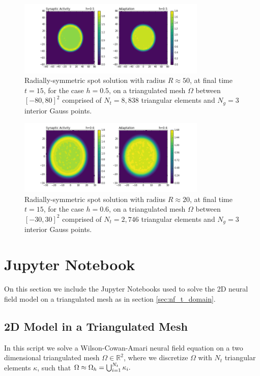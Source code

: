 \documentclass{uonmathreport}
\begin{document}
\begin{figure}
	\begin{center}
		\includegraphics[width=0.8\textwidth]{Figures/Adapt_8838elems_(p5)h.png}
	\end{center}
	\caption{Radially-symmetric spot solution with radius $R\approx 50$, at final time $t=15$, for the case $h=0.5$, on a triangulated mesh $\Omega$ between $[-80,80]^2$ comprised of $N_t=8,838$ triangular elements and $N_g=3$ interior Gauss points.}
	\label{fig:tri_mesh_adapt_p5h}
\end{figure}

\begin{figure}
	\begin{center}
		\includegraphics[width=0.8\textwidth]{Figures/Adapt_2746elems_(p6)h.png}
	\end{center}
	\caption{Radially-symmetric spot solution with radius $R\approx 20$, at final time $t=15$, for the case $h=0.6$, on a triangulated mesh $\Omega$ between $[-30,30]^2$ comprised of $N_t=2,746$ triangular elements and $N_g=3$ interior Gauss points.}
	\label{fig:tri_mesh_adapt_p6h}
\end{figure}
\section{Jupyter Notebook} \label{sec:jupyter_notebook}
On this section we include the Jupyter Notebooks used to solve the 2D neural field model on a triangulated mesh as in section \ref{sec:nf_t_domain}.
\subsection{2D Model in a Triangulated Mesh}
In this script we solve a Wilson-Cowan-Amari neural field equation on a
two dimensional triangulated mesh \(\Omega \in \mathbb{R}^2\), where we
discretize \(\Omega\) with \(N_t\) triangular elements \(\kappa\), such
that \(\Omega \approx \Omega_h = \bigcup_{i=1}^{N_t} \kappa_{i}.\\\)
\end{document}
